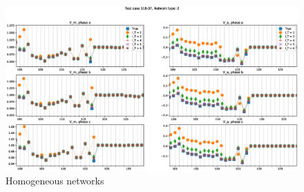 \documentclass[10pt,journal]{article}
\begin{document}
\begin{figure}
\centering
\includegraphics[width=\textwidth]{Images/Z_MAI_N2.eps}
\caption{Homogeneous networks}
\end{figure}
\end{document}
